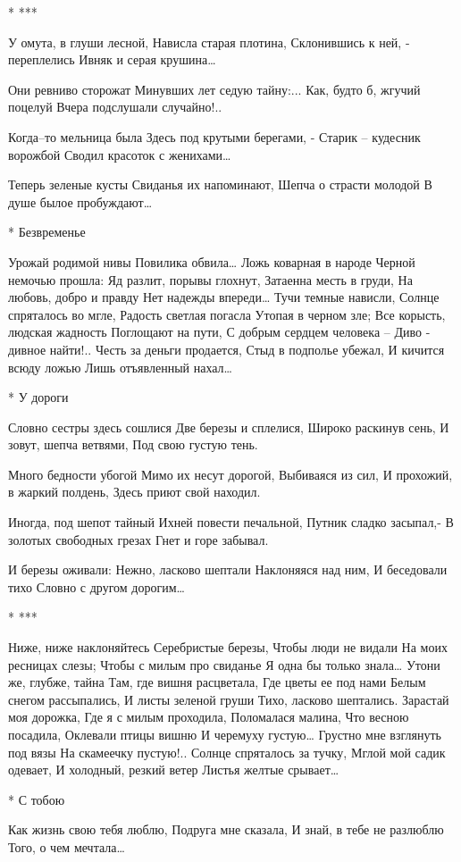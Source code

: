 * ***

У омута, в глуши лесной,
Нависла старая плотина,
Склонившись к ней, - переплелись
Ивняк и серая крушина…

Они ревниво сторожат
Минувших лет седую тайну:...
Как, будто б, жгучий поцелуй
Вчера подслушали случайно!..

Когда–то мельница была
Здесь под крутыми берегами, -
Старик – кудесник ворожбой
Сводил красоток с женихами…

Теперь зеленые кусты
Свиданья их напоминают,
Шепча о страсти молодой
В душе былое пробуждают…


* Безвременье

Урожай родимой нивы
Повилика обвила…
Ложь коварная в народе
Черной немочью прошла:
Яд разлит, порывы глохнут,
Затаенна месть в груди,
На любовь, добро и правду
Нет надежды впереди…
Тучи темные нависли,
Солнце спряталось во мгле,
Радость светлая погасла
Утопая в черном зле;
Все корысть, людская жадность
Поглощают на пути,
С добрым сердцем человека –
Диво - дивное найти!..
Честь за деньги продается,
Стыд в подполье убежал,
И кичится всюду ложью
Лишь отъявленный нахал…


* У дороги

Словно сестры здесь сошлися
Две березы и сплелися,
Широко раскинув сень,
И зовут, шепча ветвями,
Под свою густую тень.

Много бедности убогой
Мимо их несут дорогой,
Выбиваяся из сил,
И прохожий, в жаркий полдень,
Здесь приют свой находил.

Иногда, под шепот тайный
Ихней повести печальной,
Путник сладко засыпал,-
В золотых свободных грезах
Гнет и горе забывал.

И березы оживали:
Нежно, ласково шептали
Наклоняяся над ним,
И беседовали тихо
Словно с другом дорогим…


* ***

Ниже, ниже наклоняйтесь
Серебристые березы,
Чтобы люди не видали
На моих ресницах слезы;
Чтобы с милым про свиданье
Я одна бы только знала…
Утони же, глубже, тайна
Там, где вишня расцветала,
Где цветы ее под нами
Белым снегом рассыпались,
И листы зеленой груши
Тихо, ласково шептались.
Зарастай моя дорожка,
Где я с милым проходила,
Поломалася малина,
Что весною посадила,
Оклевали птицы вишню
И черемуху густую…
Грустно мне взглянуть под вязы
На скамеечку пустую!..
Солнце спряталось за тучку,
Мглой мой садик одевает,
И холодный, резкий ветер
Листья желтые срывает…


* С тобою

Как жизнь свою тебя люблю,
Подруга мне сказала,
И знай, в тебе не разлюблю
Того, о чем мечтала…

